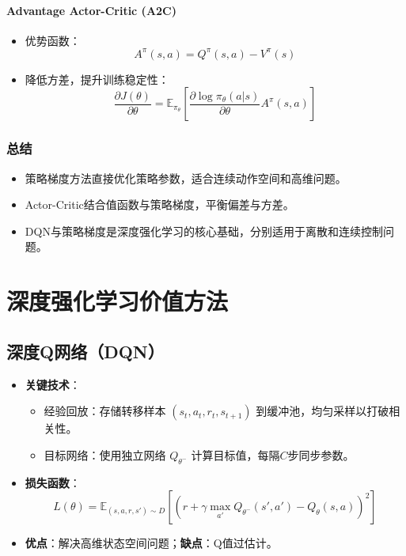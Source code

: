 \paragraph{Advantage Actor-Critic (A2C)}
\begin{itemize}
    \item 优势函数：
    \[
    A^{\pi}(s,a) = Q^{\pi}(s,a) - V^{\pi}(s)
    \]
    \item 降低方差，提升训练稳定性：
    \[
    \frac{\partial J(\theta)}{\partial \theta} = \mathbb{E}_{\pi_\theta} \left[ \frac{\partial \log \pi_\theta(a|s)}{\partial \theta} A^{\pi}(s,a) \right]
    \]
\end{itemize}

\subsubsection{总结}
\begin{itemize}
    \item 策略梯度方法直接优化策略参数，适合连续动作空间和高维问题。
    \item Actor-Critic结合值函数与策略梯度，平衡偏差与方差。
    \item DQN与策略梯度是深度强化学习的核心基础，分别适用于离散和连续控制问题。
\end{itemize}

\section{深度强化学习价值方法}

\subsection{深度Q网络（DQN）}
\begin{itemize}
    \item \textbf{关键技术}：
    \begin{itemize}
        \item 经验回放：存储转移样本 \((s_t, a_t, r_t, s_{t+1})\) 到缓冲池，均匀采样以打破相关性。
        \item 目标网络：使用独立网络 \(Q_{\theta^-}\) 计算目标值，每隔\(C\)步同步参数。
    \end{itemize}
    \item \textbf{损失函数}：
    \[
    L(\theta) = \mathbb{E}_{(s,a,r,s') \sim D} \left[ \left( r + \gamma \max_{a'} Q_{\theta^-}(s', a') - Q_\theta(s, a) \right)^2 \right]
    \]
    \item \textbf{优点}：解决高维状态空间问题；\textbf{缺点}：Q值过估计。
\end{itemize}

